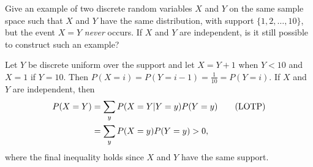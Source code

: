 
\setcounter{theorem}{15}
\begin{exercise}[BH.3.39]
  Give an example of two discrete random variables $X$ and $Y$ on the same sample space such that $X$ and $Y$ have the same distribution, with support $\{1,2, \ldots,10\}$, but the event $X = Y$ \emph{never} occurs. If $X$ and $Y$ are independent, is it still possible to construct such an example?
\begin{solution}
    Let $Y$ be discrete uniform over the support and let $X=Y+1$ when $Y<10$ and $X=1$ if $Y=10$. Then $P(X=i) = P(Y=i-1) = \frac{1}{10} = P(Y=i)$. If $X$ and $Y$ are independent, then
    \begin{align*}
        P(X=Y) &= \sum_{y}P(X=Y|Y=y)P(Y=y) \tag*{(\text{LOTP})}\\
        &= \sum_{y}P(X=y)P(Y=y)>0,
    \end{align*}
    where the final inequality holds since $X$ and $Y$ have the same support.
\end{solution}
\end{exercise}


